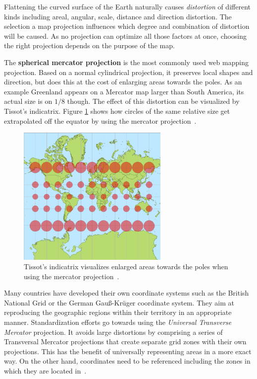 Flattening the curved surface of the Earth naturally causes \textit{distortion} of different kinds including areal, angular, scale, distance and direction distortion. The selection a map projection influences which degree and combination of distortion will be caused. As no projection can optimize all those factors at once, choosing the right projection depends on the purpose of the map.

The \textbf{spherical mercator projection} is the most commonly used web mapping projection. Based on a normal cylindrical projection, it preserves local shapes and direction, but does this at the cost of enlarging areas towards the poles. As an example Greenland appears on a Mercator map larger than South America, its actual size is on $1/8$ though. The effect of this distortion can be visualized by Tissot's indicatrix. Figure \ref{fig:mercator} shows how circles of the same relative size get extrapolated off the equator by using the mercator projection~\cite{Zzolo11mappingdrupal, wiki:web-mapping, Kupper2005lbs}. 

\begin{figure}[h]
  \begin{center}
    \includegraphics[width=0.65\textwidth]{figures/tissot_mercator.png}
    \caption{Tissot's indicatrix visualizes enlarged areas towards the poles when using the mercator projection~\cite{wiki:mercator}.}
    \label{fig:mercator}
  \end{center}
\end{figure}

Many countries have developed their own coordinate systems such as the British National Grid or the German Gau\ss-Kr\"{u}ger coordinate system. They aim at reproducing the geographic regions within their territory in an appropriate manner. Standardization efforts go towards using the \textit{Universal Transverse Mercator} projection. It avoids large distortions by comprising a series of Transversal Mercator projections that create separate grid zones with their own projections. This has the benefit of universally representing areas in a more exact way. On the other hand, coordinates need to be referenced including the zones in which they are located in~\cite{Kupper2005lbs}.

